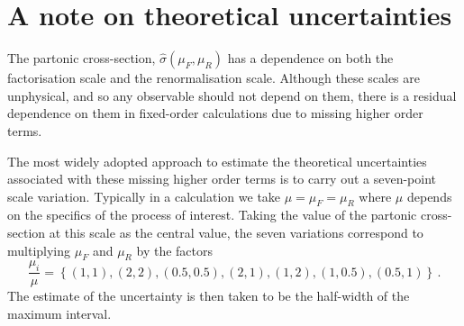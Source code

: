 \documentclass[main.tex]{subfiles}
\begin{document}
    \section{A note on theoretical uncertainties}\label{sec:scale_variations}
    The partonic cross-section, $\hat{\sigma}(\mu_{F}, \mu_{R})$ has
    a dependence on both the factorisation scale and the
    renormalisation scale. Although these scales are unphysical,
    and so any observable should not depend on them,
    there is a residual dependence on them in fixed-order
    calculations due to missing higher order terms.

    The most widely adopted approach to estimate the
    theoretical uncertainties associated with these
    missing higher order terms is to carry out a seven-point
    scale variation. Typically in a calculation we take
    $\mu = \mu_{F} = \mu_{R}$ where $\mu$ depends on the specifics
    of the process of interest. Taking the value of the
    partonic cross-section at this scale as the central value,
    the seven variations correspond to multiplying $\mu_{F}$
    and $\mu_{R}$ by the factors
    \begin{equation}\label{eqn:scale_variations}
        \dfrac{\mu_{i}}{\mu} = \left\{(1, 1), (2,2),(0.5,0.5),(2,1),(1,2),(1,0.5),(0.5,1)\right\} \, .
    \end{equation}
    The estimate of the uncertainty is then taken
    to be the half-width of the maximum interval.
\end{document}
